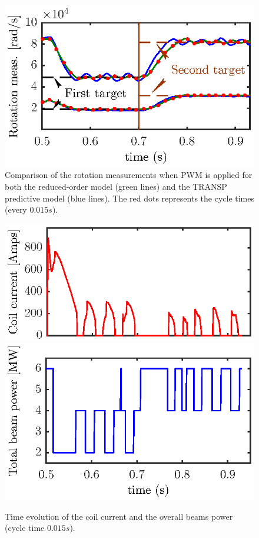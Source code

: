\documentclass{iopart}
\begin{document}
\begin{figure}
	\centering
	\includegraphics{imene_figs/fig16} %
	\caption{Comparison of the rotation measurements when PWM is applied for both the reduced-order model (green lines) and the TRANSP predictive model (blue lines). The red dots represents the cycle times (every $0.015 s$).}
	\label{fig:rot14}
\end{figure}

\begin{figure}
	\centering
	\includegraphics{imene_figs/fig17a}  \\[-0.5em] %
	\includegraphics{imene_figs/fig17b} 
	\caption{Time evolution of the coil current and the overall beams power (cycle time $0.015  s$).}
	\label{fig:rot15}
\end{figure}
\end{document}
